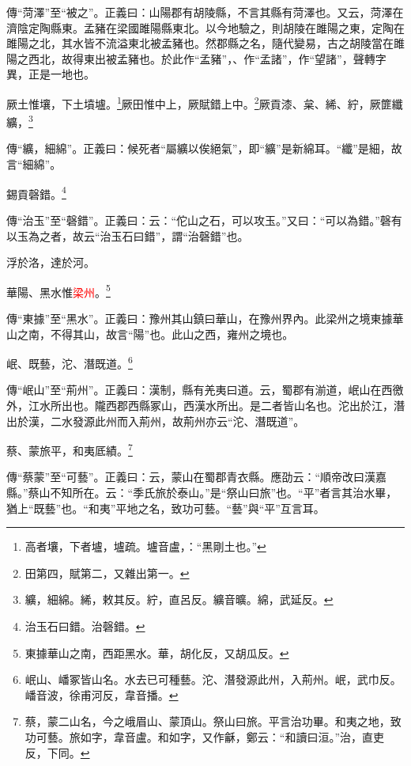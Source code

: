 {\noindent\zhuan{}\fzbyks 傳“菏澤”至“被之”。正義曰：山陽郡有胡陵縣，不言其縣有菏澤也。又云，菏澤在濟陰定陶縣東。孟豬在梁國雎陽縣東北。以今地驗之，則胡陵在雎陽之東，定陶在雎陽之北，其水皆不流溢東北被孟豬也。然郡縣之名，隨代變易，古之胡陵當在雎陽之西北，故得東出被孟豬也。於此作“孟豬”，、作“孟諸”，作“望諸”，聲轉字異，正是一地也。 \par}

厥土惟壤，下土墳壚。\footnote{高者壤，下者壚，壚疏。壚音盧，：“黑剛土也。”}厥田惟中上，厥賦錯上中。\footnote{田第四，賦第二，又雜出第一。}厥貢漆、枲、絺、紵，厥篚纖纊，\footnote{纊，細綿。絺，敕其反。紵，直呂反。纊音曠。綿，武延反。}

{\noindent\zhuan{}\fzbyks 傳“纊，細綿”。正義曰：候死者“屬纊以俟絕氣”，即“纊”是新綿耳。“纖”是細，故言“細綿”。 \par}

錫貢磬錯。\footnote{治玉石曰錯。治磬錯。}

{\noindent\zhuan{}\fzbyks 傳“治玉”至“磬錯”。正義曰：云：“佗山之石，可以攻玉。”又曰：“可以為錯。”磬有以玉為之者，故云“治玉石曰錯”，謂“治磬錯”也。 \par}

浮於洛，達於河。

華陽、黑水惟\textcolor{red}{梁州}。\footnote{東據華山之南，西距黑水。華，胡化反，又胡瓜反。}

{\noindent\zhuan{}\fzbyks 傳“東據”至“黑水”。正義曰：豫州其山鎮曰華山，在豫州界內。此梁州之境東據華山之南，不得其山，故言“陽”也。此山之西，雍州之境也。 \par}

岷、既藝，沱、潛既道。\footnote{岷山、嶓冢皆山名。水去已可種藝。沱、潛發源此州，入荊州。岷，武巾反。嶓音波，徐甫河反，韋音播。}

{\noindent\zhuan{}\fzbyks 傳“岷山”至“荊州”。正義曰：漢制，縣有羌夷曰道。云，蜀郡有湔道，岷山在西徼外，江水所出也。隴西郡西縣冢山，西漢水所出。是二者皆山名也。沱出於江，潛出於漢，二水發源此州而入荊州，故荊州亦云“沱、潛既道”。 \par}

蔡、蒙旅平，和夷厎績。\footnote{蔡，蒙二山名，今之峨眉山、蒙頂山。祭山曰旅。平言治功畢。和夷之地，致功可藝。旅如字，韋音盧。和如字，又作龢，鄭云：“和讀曰洹。”治，直吏反，下同。}

{\noindent\zhuan{}\fzbyks 傳“蔡蒙”至“可藝”。正義曰：云，蒙山在蜀郡青衣縣。應劭云：“順帝改曰漢嘉縣。”蔡山不知所在。云：“季氏旅於泰山。”是“祭山曰旅”也。“平”者言其治水畢，猶上“既藝”也。“和夷”平地之名，致功可藝。“藝”與“平”互言耳。 \par}

